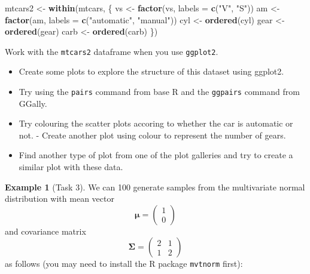 \documentclass[]{book}
\newenvironment{Shaded}{\begin{snugshade}}{\end{snugshade}}
\newcommand{\DataTypeTok}[1]{\textcolor[rgb]{0.13,0.29,0.53}{#1}}
\newcommand{\KeywordTok}[1]{\textcolor[rgb]{0.13,0.29,0.53}{\textbf{#1}}}
\newcommand{\NormalTok}[1]{#1}
\newcommand{\StringTok}[1]{\textcolor[rgb]{0.31,0.60,0.02}{#1}}
\providecommand{\tightlist}{%
  \setlength{\itemsep}{0pt}\setlength{\parskip}{0pt}}
\theoremstyle{definition}
\theoremstyle{definition}
\newtheorem{example}{Example}[chapter]
\theoremstyle{definition}
\theoremstyle{remark}
\begin{document}
\begin{Shaded}
\begin{Highlighting}[]
\NormalTok{mtcars2 <-}\StringTok{ }\KeywordTok{within}\NormalTok{(mtcars, \{}
\NormalTok{   vs <-}\StringTok{ }\KeywordTok{factor}\NormalTok{(vs, }\DataTypeTok{labels =} \KeywordTok{c}\NormalTok{(}\StringTok{"V"}\NormalTok{, }\StringTok{"S"}\NormalTok{))}
\NormalTok{   am <-}\StringTok{ }\KeywordTok{factor}\NormalTok{(am, }\DataTypeTok{labels =} \KeywordTok{c}\NormalTok{(}\StringTok{"automatic"}\NormalTok{, }\StringTok{"manual"}\NormalTok{))}
\NormalTok{   cyl  <-}\StringTok{ }\KeywordTok{ordered}\NormalTok{(cyl)}
\NormalTok{   gear <-}\StringTok{ }\KeywordTok{ordered}\NormalTok{(gear)}
\NormalTok{   carb <-}\StringTok{ }\KeywordTok{ordered}\NormalTok{(carb)}
\NormalTok{\})}
\end{Highlighting}
\end{Shaded}

Work with the \texttt{mtcars2} dataframe when you use \texttt{ggplot2}.

\begin{itemize}
\tightlist
\item
  Create some plots to explore the structure of this dataset using ggplot2.
\item
  Try using the \texttt{pairs} command from base R and the \texttt{ggpairs} command from GGally.
\item
  Try colouring the scatter plots accoring to whether the car is automatic or not. - Create another plot using colour to represent the number of gears.
\item
  Find another type of plot from one of the plot galleries and try to create a similar plot with these data.
\end{itemize}

\begin{example}[Task 3]
\protect\hypertarget{exm:unnamed-chunk-16}{}{\label{exm:unnamed-chunk-16} {} }We can 100 generate samples from the multivariate normal distribution with mean vector
\[\boldsymbol \mu= \left(\begin{array}{c}1\\0\end{array}\right)\]
and covariance matrix
\[\boldsymbol \Sigma= \left(\begin{array}{cc}2&1\\1&2\end{array}\right)\]
as follows (you may need to install the R package \texttt{mvtnorm} first):
\end{example}
\end{document}

